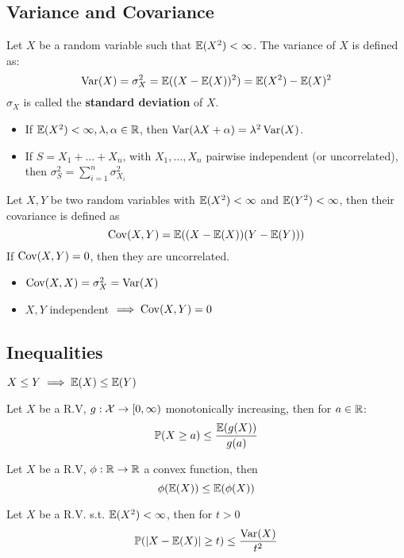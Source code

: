 \pagebreak
\subsection{Variance and Covariance}
\begin{definition*}[Variance]
  Let \(X\) be a random variable such that \(\mathbb{E}(X^2) < \infty\). The variance of \(X\) is defined as:
  \[\operatorname{Var}(X) = \sigma_X^2 = \mathbb{E}((X - \mathbb{E}(X))^2) = \mathbb{E}(X^2) - \mathbb{E}(X)^2\]
  \(\sigma_X\) is called the \textbf{standard deviation} of \(X\).
\end{definition*}

\begin{itemize}
  \item If \(\mathbb{E}(X^2) < \infty, \lambda, \alpha \in \mathbb{R}\), then \(\operatorname{Var}(\lambda X + \alpha) = \lambda^2 \operatorname{Var}(X)\).
  \item If \(S = X_1 + \ldots + X_n\), with \(X_1, \ldots, X_n\) pairwise independent (or uncorrelated), then \(\sigma_S^2 = \sum_{i = 1}^n \sigma_{X_i}^2\)
\end{itemize}

\begin{definition*}[Covariance]
  Let \(X, Y\) be two random variables with \(\mathbb{E}(X^2) < \infty\) and \(\mathbb{E}(Y^2) < \infty\), then their covariance is defined as
  \[\operatorname{Cov}(X, Y) = \mathbb{E}((X - \mathbb{E}(X))(Y - \mathbb{E}(Y)))\]
  If \(\operatorname{Cov}(X, Y) = 0\), then they are uncorrelated.
\end{definition*}
\begin{itemize}
  \item \(\operatorname{Cov}(X, X) = \sigma_X^2 = \operatorname{Var}(X)\)
  \item \(X, Y\) independent \(\implies \operatorname{Cov}(X, Y) = 0\)
\end{itemize}

\subsection{Inequalities}
\begin{lemma}[Monotonicity]
  \(X \leq Y \implies \mathbb{E}(X) \leq \mathbb{E}(Y)\)
\end{lemma}

\begin{theorem*}
  Let \(X\) be a R.V, \(g: \operatorname{\mathcal{X}} \to [0, \infty)\) monotonically increasing, then for \(a \in \mathbb{R}\):
  \[\mathbb{P}(X \geq a) \leq \frac{\mathbb{E}(g(X))}{g(a)}\]
\end{theorem*}

\begin{theorem*}
  Let \(X\) be a R.V, \(\phi: \mathbb{R} \to \mathbb{R}\) a convex function, then
  \[\phi(\mathbb{E}(X)) \leq \mathbb{E}(\phi(X))\]
\end{theorem*}

\begin{theorem*}
  Let \(X\) be a R.V. s.t. \(\mathbb{E}(X^2) < \infty\), then for \(t > 0\)
  \[\mathbb{P}(|X - \mathbb{E}(X)| \geq t) \leq \frac{\operatorname{Var}(X)}{t^2}\]
\end{theorem*}
